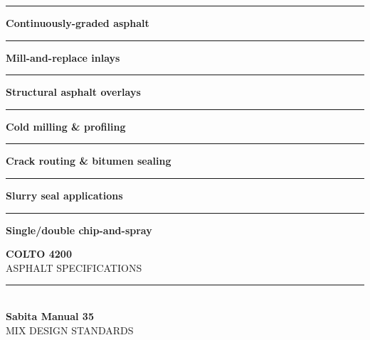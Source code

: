 \documentclass[a4paper,11pt]{article}
\begin{document}
\begin{minipage}[t]{0.34\textwidth}
    \vspace{0pt}
    \begin{tcolorbox}[
        enhanced, colback=mhoffwhite, colframe=mhnavy, boxrule=1pt, arc=4pt,
        title={\bfseries\color{white}\faLayerGroup\ Surfacing Scope of Work},
        colbacktitle=mhnavy, left=7pt, right=7pt, top=6pt, bottom=6pt,
        drop shadow=black!6
    ]
        \fontsize{8.1pt}{11.6pt}\selectfont
        \textcolor{mhnavy}{\rule{4pt}{4pt}}\hspace{4pt}\textbf{Continuously-graded asphalt}\\
        \textcolor{mhnavy}{\rule{4pt}{4pt}}\hspace{4pt}\textbf{Mill-and-replace inlays}\\
        \textcolor{mhnavy}{\rule{4pt}{4pt}}\hspace{4pt}\textbf{Structural asphalt overlays}\\
        \textcolor{mhnavy}{\rule{4pt}{4pt}}\hspace{4pt}\textbf{Cold milling \& profiling}\\
        \textcolor{mhnavy}{\rule{4pt}{4pt}}\hspace{4pt}\textbf{Crack routing \& bitumen sealing}\\
        \textcolor{mhnavy}{\rule{4pt}{4pt}}\hspace{4pt}\textbf{Slurry seal applications}\\
        \textcolor{mhnavy}{\rule{4pt}{4pt}}\hspace{4pt}\textbf{Single/double chip-and-spray}
    \end{tcolorbox}

    \vspace{0.20cm}

    \begin{tcolorbox}[
        enhanced, colback=white, colframe=mhlightgray, boxrule=0.8pt, arc=4pt,
        left=6pt, right=6pt, top=6pt, bottom=6pt, halign=center,
        drop shadow=black!4
    ]
        {\fontsize{18pt}{20pt}\selectfont\bfseries\color{mhblue}COLTO 4200}\\[1pt]
        {\fontsize{7.4pt}{9pt}\selectfont\color{mhtextmuted}\MakeUppercase{Asphalt Specifications}}\\[4pt]
        \textcolor{mhlightgray}{\rule{3.2cm}{0.6pt}}\\[4pt]
        {\fontsize{13pt}{15pt}\selectfont\bfseries\color{mhnavy}Sabita Manual 35}\\[1pt]
        {\fontsize{7.2pt}{9pt}\selectfont\color{mhtextmuted}\MakeUppercase{Mix Design Standards}}
    \end{tcolorbox}
\end{minipage}
\end{document}
